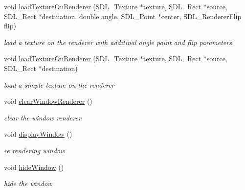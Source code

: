 \begin{DoxyCompactItemize}
\hypertarget{class_s_d_l_window_abfcc4c32669c62201c875e00f2552ce4}{}\label{class_s_d_l_window_abfcc4c32669c62201c875e00f2552ce4} 
void \hyperlink{class_s_d_l_window_abfcc4c32669c62201c875e00f2552ce4}{load\+Texture\+On\+Renderer} (S\+D\+L\+\_\+\+Texture $\ast$texture, S\+D\+L\+\_\+\+Rect $\ast$source, S\+D\+L\+\_\+\+Rect $\ast$destination, double angle, S\+D\+L\+\_\+\+Point $\ast$center, S\+D\+L\+\_\+\+Renderer\+Flip flip)
\begin{DoxyCompactList}\small\item\em load a texture on the renderer with additinal angle point and flip parameters \end{DoxyCompactList}\item 
\hypertarget{class_s_d_l_window_adc5af8f98141f2bf9902fe3a65e84eec}{}\label{class_s_d_l_window_adc5af8f98141f2bf9902fe3a65e84eec} 
void \hyperlink{class_s_d_l_window_adc5af8f98141f2bf9902fe3a65e84eec}{load\+Texture\+On\+Renderer} (S\+D\+L\+\_\+\+Texture $\ast$texture, S\+D\+L\+\_\+\+Rect $\ast$source, S\+D\+L\+\_\+\+Rect $\ast$destination)
\begin{DoxyCompactList}\small\item\em load a simple texture on the renderer \end{DoxyCompactList}\item 
\hypertarget{class_s_d_l_window_a3790dc5cfd442ca4f72d1f2e0229c99c}{}\label{class_s_d_l_window_a3790dc5cfd442ca4f72d1f2e0229c99c} 
void \hyperlink{class_s_d_l_window_a3790dc5cfd442ca4f72d1f2e0229c99c}{clear\+Window\+Renderer} ()
\begin{DoxyCompactList}\small\item\em clear the window renderer \end{DoxyCompactList}\item 
\hypertarget{class_s_d_l_window_afb40da63752fa21cefcde9a235e7bb3e}{}\label{class_s_d_l_window_afb40da63752fa21cefcde9a235e7bb3e} 
void \hyperlink{class_s_d_l_window_afb40da63752fa21cefcde9a235e7bb3e}{display\+Window} ()
\begin{DoxyCompactList}\small\item\em re rendering window \end{DoxyCompactList}\item 
\hypertarget{class_s_d_l_window_a654dd50a126bbdf4da9c3bc4b60ec949}{}\label{class_s_d_l_window_a654dd50a126bbdf4da9c3bc4b60ec949} 
void \hyperlink{class_s_d_l_window_a654dd50a126bbdf4da9c3bc4b60ec949}{hide\+Window} ()
\begin{DoxyCompactList}\small\item\em hide the window \end{DoxyCompactList}\item 

\end{DoxyCompactItemize}

